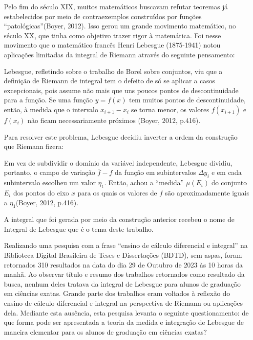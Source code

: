     Pelo fim do século XIX, muitos matemáticos buscavam refutar teoremas já estabelecidos por meio de contraexemplos construídos por funções \enquote{patológicas}(Boyer, 2012).
    Isso gerou um grande movimento matemático, no século XX, que tinha como objetivo trazer rigor à matemática.
    Foi nesse movimento que o matemático francês Henri Lebesgue (1875-1941) notou aplicações limitadas da integral de Riemann através do seguinte pensamento:
    
    \begin{citlon}
    	Lebesgue, refletindo sobre o trabalho de Borel sobre conjuntos, viu que a definição de Riemann de integral tem o defeito de só se aplicar a casos
    	excepcionais, pois assume não mais que uns poucos pontos de descontinuidade para a função.
    	Se uma função $y = f(x)$ tem muitos pontos de descontinuidade, então, à medida que o intervalo $x_{i+1} - x_i$
    	se torna menor, os valores $f(x_{i+1})$ e $f(x_i)$ não ficam
    	necessariamente próximos (Boyer, 2012, p.416).  	
    \end{citlon}

    Para resolver este problema, Lebesgue decidiu inverter a ordem da construção que Riemann fizera:
    
    \begin{citlon}
    	Em vez de subdividir o domínio da variável independente, Lebesgue dividiu, portanto, o campo de variação $\overline{f} - f$ 
    	da função em subintervalos $\Delta y_i$ e em cada subintervalo
    	escolheu um valor $\eta_1$. 
    	Então, achou a \enquote{medida} $\mu(E_i)$ do conjunto $E_i$ dos pontos do eixo $x$ para os
    	quais os valores de $f$ são aproximadamente iguais a $\eta_1$(Boyer, 2012, p.416).
    \end{citlon}
    
    A integral que foi gerada por meio da construção anterior recebeu o nome de Integral de Lebesgue que é o tema deste trabalho.
    
    Realizando uma pesquisa com a frase \enquote{ensino de cálculo diferencial e integral} na Biblioteca Digital Brasileira de Teses e Dissertações (BDTD), sem
    aspas, foram retornados 310 resultados na data do dia 29 de Outubro de 2023 às 10 horas da manhã.
    Ao observar título e resumo dos trabalhos retornados como resultado da busca, nenhum deles tratava da integral de Lebesgue para alunos de graduação em ciências exatas.
    Grande parte dos trabalhos eram voltados à reflexão do ensino de cálculo diferencial e integral na perspectiva de Riemann ou aplicações dela.
    Mediante esta ausência, esta pesquisa levanta o seguinte questionamento: de que forma pode ser apresentada a teoria da medida e integração de Lebesgue de maneira elementar para os alunos de graduação em ciências exatas?
    
